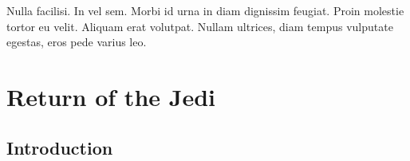 \graphicspath{{figures/chapter-7/}}


\begin{savequote}[75mm]
Nulla facilisi. In vel sem. Morbi id urna in diam dignissim feugiat. Proin molestie tortor eu velit. Aliquam erat volutpat. Nullam    ultrices, diam tempus vulputate egestas, eros pede varius leo.
\end{savequote}

\chapter{Return of the Jedi}


\section{Introduction}

\lipsum[10]


